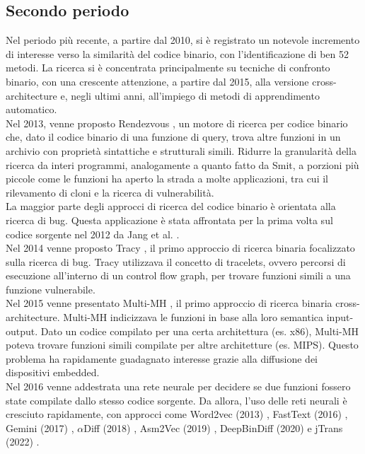 \documentclass[12pt,a4paper,openright,twoside]{report}
\begin{document}
\subsection{Secondo periodo}

Nel periodo più recente, a partire dal 2010,  si è registrato un notevole incremento di interesse verso la similarità del codice binario, con l’identificazione di ben 52 metodi. La ricerca si è concentrata principalmente su tecniche di confronto binario, con una crescente attenzione, a partire dal 2015, alla versione cross-architecture e, negli ultimi anni, all’impiego di metodi di apprendimento automatico.\\
Nel 2013, venne proposto Rendezvous \cite{rendezvous}, un motore di ricerca per codice binario che, dato il codice binario di una funzione di query, trova altre funzioni in un archivio con proprietà sintattiche e strutturali simili. Ridurre la granularità della ricerca da interi programmi, analogamente a quanto fatto da Smit, a porzioni più piccole come le funzioni ha aperto la strada a molte applicazioni, tra cui il rilevamento di cloni e la ricerca di vulnerabilità.\\
La maggior parte degli approcci di ricerca del codice binario è orientata alla ricerca di bug. Questa applicazione è stata affrontata per la prima volta sul codice sorgente nel 2012 da Jang et al. \cite{jang2012redebug}.\\
Nel 2014 venne proposto Tracy \cite{david2014}, il primo approccio di ricerca binaria focalizzato sulla ricerca di bug. Tracy utilizzava il concetto di tracelets, ovvero percorsi di esecuzione all’interno di un control flow graph, per trovare funzioni simili a una funzione vulnerabile.\\
Nel 2015 venne presentato Multi-MH \cite{pewny2015}, il primo approccio di ricerca binaria cross-architecture. Multi-MH indicizzava le funzioni in base alla loro semantica input-output. Dato un codice compilato per una certa architettura (es. x86), Multi-MH poteva trovare funzioni simili compilate per altre architetture (es. MIPS). Questo problema ha rapidamente guadagnato interesse grazie alla diffusione dei dispositivi embedded.\\
Nel 2016 venne addestrata una rete neurale \cite{lageman2016} per decidere se due funzioni fossero state compilate dallo stesso codice sorgente. Da allora, l’uso delle reti neurali è cresciuto rapidamente, con approcci come Word2vec (2013) \cite{word2vec}, FastText (2016) \cite{fastText}, Gemini (2017) \cite{gemini}, $\alpha$Diff (2018) \cite{alphadiff}, Asm2Vec (2019) \cite{Asm2Vec}, DeepBinDiff (2020) \cite{deepbindiff} e jTrans (2022) \cite{jTrans}.
\end{document}
